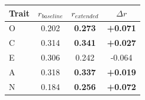 \begin{tabular}{lccc}
\toprule
Trait & $r_{baseline}$ & $r_{extended}$ & $\Delta r$ \\
\midrule
O & 0.202 & \textbf{0.273} & \textbf{+0.071} \\
C & 0.314 & \textbf{0.341} & \textbf{+0.027} \\
E & 0.306 & 0.242 & -0.064 \\
A & 0.318 & \textbf{0.337} & \textbf{+0.019} \\
N & 0.184 & \textbf{0.256} & \textbf{+0.072} \\
\bottomrule
\end{tabular}
